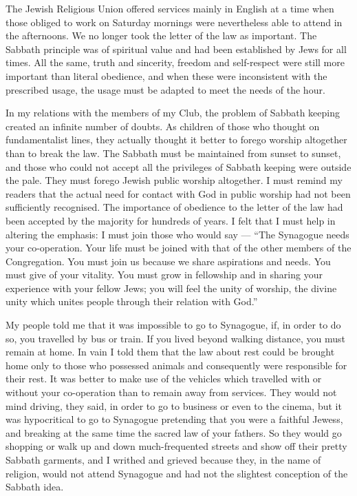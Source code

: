 The Jewish Religious Union offered services mainly
in English at a time when those obliged to work on
Saturday mornings were nevertheless able to attend in
the afternoons. We no longer took the letter of the law
as important. The Sabbath principle was of spiritual
value and had been established by Jews for all times.
All the same, truth and sincerity, freedom and self-respect
were still more important than literal obedience,
and when these were inconsistent with the prescribed
usage, the usage must be adapted to meet the needs of the
hour.

In my relations with the members of my Club, the
problem of Sabbath keeping created an infinite number
of doubts. As children of those who thought on fundamentalist
lines, they actually thought it better to forego
worship altogether than to break the law. The Sabbath
must be maintained from sunset to sunset, and those who
could not accept all the privileges of Sabbath keeping
were outside the pale. They must forego Jewish public
worship altogether. I must remind my readers
that the actual need for contact with God in
public worship had not been sufficiently recognised.
The importance of obedience to the letter of the law
had been accepted by the majority for hundreds of
years. I felt that I must help in altering the emphasis:
I must join those who would say — “The Synagogue needs
your co-operation. Your life must be joined with that
of the other members of the Congregation. You must
join us because we share aspirations and needs. You
must give of your vitality. You must grow in fellowship
and in sharing your experience with your fellow Jews;
you will feel the unity of worship, the divine unity which
unites people through their relation with God.”

My people told me that it was impossible to go to
Synagogue, if, in order to do so, you travelled by bus or
train. If you lived beyond walking distance, you must
remain at home. In vain I told them that the law about
rest could be brought home only to those who possessed
animals and consequently were responsible for their rest.
It was better to make use of the vehicles which travelled
with or without your co-operation than to remain away
from services. They would not mind driving, they said,
in order to go to business or even to the cinema, but it
was hypocritical to go to Synagogue pretending that you
were a faithful Jewess, and breaking at the same time
the sacred law of your fathers. So they would go shopping
or walk up and down much-frequented streets and show
off their pretty Sabbath garments, and I writhed and
grieved because they, in the name of religion, would not
attend Synagogue and had not the slightest conception
of the Sabbath idea.


